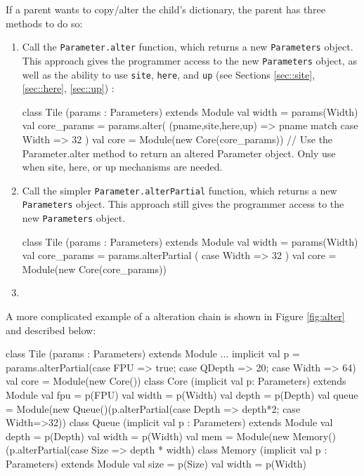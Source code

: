 \documentclass[10pt,twocolumn]{article}
\def\code#1{{\small\tt #1}}
\begin{document}
If a parent wants to copy/alter the child's dictionary, the parent has three methods to do so:
\begin{enumerate}
    
  \item Call the \code{Parameter.alter} function, which returns a new \code{Parameters} object. This approach gives the programmer access to the new \code{Parameters} object, as well as the ability to use \code{site}, \code{here}, and \code{up} (see Sections \ref{sec::site}, \ref{sec::here}, \ref{sec::up}) :
\begin{scala}
class Tile (params : Parameters) extends Module { 
  val width = params(Width)
  val core_params = params.alter(
    (pname,site,here,up) => pname match {
      case Width => 32
    })
  val core = Module(new Core(core_params))
  // Use the Parameter.alter method to return an altered Parameter object. Only use when site, here, or up mechanisms are needed.
}
\end{scala}
\item Call the simpler \code{Parameter.alterPartial} function, which returns
  a new \code{Parameters} object. This approach still gives the
  programmer access to the new \code{Parameters} object.
  \begin{scala}
class Tile (params : Parameters) extends Module { 
  val width = params(Width)
  val core_params = params.alterPartial ({
    case Width => 32
  })
  val core = Module(new Core(core_params))
}
\end{scala}
\item

\end{enumerate}
A more complicated example of a alteration chain is shown in Figure
\ref{fig:alter} and
described below:
\begin{scala}
class Tile (params : Parameters) extends Module { 
  ...
  implicit val p = params.alterPartial({case FPU => true; case QDepth => 20; case Width => 64})
  val core = Module(new Core())
}
class Core (implicit val p: Parameters) extends Module {
  val fpu   = p(FPU)
  val width = p(Width)
  val depth = p(Depth)
  val queue = Module(new Queue()(p.alterPartial({case Depth => depth*2;
    case Width=>32}))
}
class Queue (implicit val p : Parameters) extends Module {
  val depth = p(Depth)
  val width = p(Width)
  val mem = Module(new Memory()(p.alterPartial({case Size => depth * width})
}
class Memory (implicit val p : Parameters) extends Module {
  val size = p(Size)
  val width = p(Width)
}
\end{scala}
\end{document}
